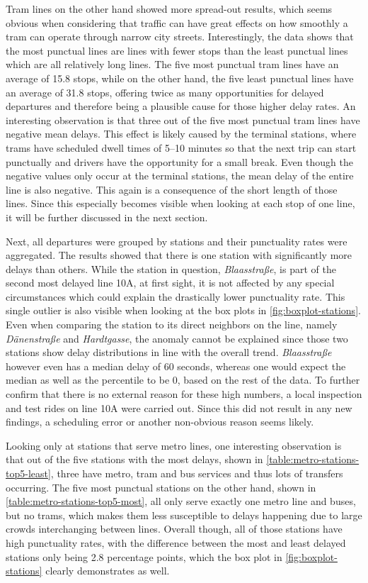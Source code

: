 Tram lines on the other hand showed more spread-out results, which seems obvious when considering that traffic can have great effects on how smoothly a tram can operate through narrow city streets. Interestingly, the data shows that the most punctual lines are lines with fewer stops than the least punctual lines which are all relatively long lines. The five most punctual tram lines have an average of 15.8 stops, while on the other hand, the five least punctual lines have an average of 31.8 stops, offering twice as many opportunities for delayed departures and therefore being a plausible cause for those higher delay rates. An interesting observation is that three out of the five most punctual tram lines have negative mean delays. This effect is likely caused by the terminal stations, where trams have scheduled dwell times of 5--10 minutes so that the next trip can start punctually and drivers have the opportunity for a small break. Even though the negative values only occur at the terminal stations, the mean delay of the entire line is also negative. This again is a consequence of the short length of those lines. Since this especially becomes visible when looking at each stop of one line, it will be further discussed in the next section.

Next, all departures were grouped by stations and their punctuality rates were aggregated. The results showed that there is one station with significantly more delays than others. While the station in question, \textit{Blaasstraße}, is part of the second most delayed line 10A, at first sight, it is not affected by any special circumstances which could explain the drastically lower punctuality rate. This single outlier is also visible when looking at the box plots in \cref{fig:boxplot-stations}. Even when comparing the station to its direct neighbors on the line, namely \textit{Dänenstraße} and \textit{Hardtgasse}, the anomaly cannot be explained since those two stations show delay distributions in line with the overall trend. \textit{Blaasstraße} however even has a median delay of 60 seconds, whereas one would expect the median as well as the  percentile to be 0, based on the rest of the data. To further confirm that there is no external reason for these high numbers, a local inspection and test rides on line 10A were carried out. Since this did not result in any new findings, a scheduling error or another non-obvious reason seems likely.

Looking only at stations that serve metro lines, one interesting observation is that out of the five stations with the most delays, shown in \cref{table:metro-stations-top5-least}, three have metro, tram and bus services and thus lots of transfers occurring. The five most punctual stations on the other hand, shown in \cref{table:metro-stations-top5-most}, all only serve exactly one metro line and buses, but no trams, which makes them less susceptible to delays happening due to large crowds interchanging between lines.
Overall though, all of those stations have high punctuality rates, with the difference between the most and least delayed stations only being 2.8 percentage points, which the box plot in \cref{fig:boxplot-stations} clearly demonstrates as well.


